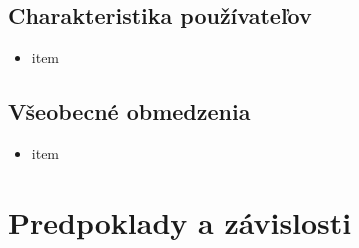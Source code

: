\documentclass[12pt,a4paper]{article}
\begin{document}
\subsection{Charakteristika používateľov}
\begin{itemize}
	\item item
\end{itemize}

\subsection{Všeobecné obmedzenia}
\begin{itemize}
	\item item
\end{itemize}

\section{Predpoklady a závislosti}
\end{document}
